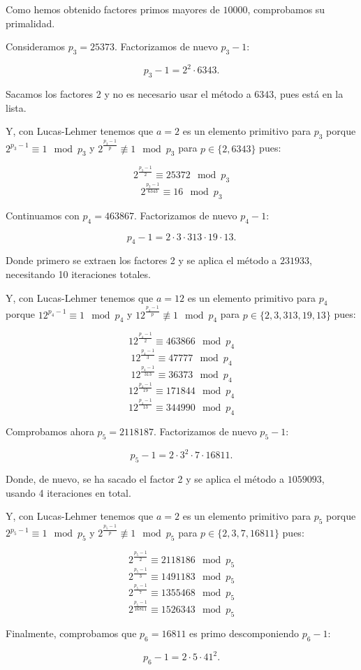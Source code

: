 \documentclass[a4paper]{article}
\begin{document}
Como hemos obtenido factores primos mayores de $10000$, comprobamos su primalidad.

Consideramos $p_3=25373$. Factorizamos de nuevo $p_3-1$:

$$p_3-1=2^2\cdot 6343.$$

Sacamos los factores 2 y no es necesario usar el método a $6343$, pues está en la lista.

Y, con Lucas-Lehmer tenemos que $a=2$ es un elemento primitivo para $p_3$ porque $2^{p_3-1}\equiv 1\mod p_3$ y $2^{\frac{p_3-1}{p}}\not\equiv 1\mod p_3 $ para $p\in\{2, 6343\}$ pues:

$$2^{\frac{p_3-1}{2}}\equiv 25372\mod p_3$$
$$2^{\frac{p_3-1}{6343}}\equiv 16\mod p_3$$

Continuamos con $p_4=463867$. Factorizamos de nuevo $p_4-1$:

$$p_4-1=2\cdot 3\cdot 313 \cdot 19\cdot 13.$$

Donde primero se extraen los factores 2 y se aplica el método a $231933$, necesitando 10 iteraciones totales.

Y, con Lucas-Lehmer tenemos que $a=12$ es un elemento primitivo para $p_4$ porque $12^{p_4-1}\equiv 1\mod p_4$ y $12^{\frac{p_4-1}{p}}\not\equiv 1\mod p_4 $ para $p\in\{2, 3, 313, 19, 13\}$ pues:

$$12^{\frac{p_4-1}{2}}\equiv 463866 \mod p_4$$
$$12^{\frac{p_4-1}{3}}\equiv 47777 \mod p_4$$
$$12^{\frac{p_4-1}{313}}\equiv 36373 \mod p_4$$
$$12^{\frac{p_4-1}{19}}\equiv 171844 \mod p_4$$
$$12^{\frac{p_4-1}{13}}\equiv 344990 \mod p_4$$

Comprobamos ahora $p_5=2118187$. Factorizamos de nuevo $p_5-1$:

$$p_5-1=2\cdot 3^2\cdot 7 \cdot 16811.$$

Donde, de nuevo, se ha sacado el factor 2 y se aplica el método a $1059093$, usando 4 iteraciones en total.

Y, con Lucas-Lehmer tenemos que $a=2$ es un elemento primitivo para $p_5$ porque $2^{p_5-1}\equiv 1\mod p_5$ y $2^{\frac{p_5-1}{p}}\not\equiv 1\mod p_5 $ para $p\in\{2, 3, 7, 16811\}$ pues:

$$2^{\frac{p_5-1}{2}}\equiv 2118186 \mod p_5$$
$$2^{\frac{p_5-1}{3}}\equiv 1491183 \mod p_5$$
$$2^{\frac{p_5-1}{7}}\equiv 1355468 \mod p_5$$
$$2^{\frac{p_5-1}{16811}}\equiv 1526343 \mod p_5$$

Finalmente, comprobamos que $p_6=16811$ es primo descomponiendo $p_6-1$:

$$p_6-1=2\cdot 5\cdot 41^2.$$
\end{document}
